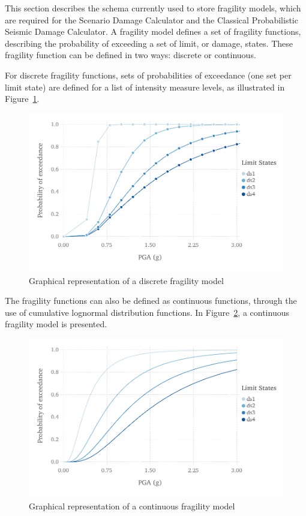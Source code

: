 This section describes the schema currently used to store \glspl{fragility
model}, which are required for the Scenario Damage Calculator and the
Classical Probabilistic Seismic Damage Calculator. A \gls{fragility model}
defines a set of \glspl{fragility function}, describing the probability of
exceeding a set of limit, or damage, states. These \gls{fragility function}
can be defined in two ways: discrete or continuous.

For discrete fragility functions, sets of probabilities of exceedance (one set
per limit state) are defined for a list of intensity measure levels, as
illustrated in Figure~\ref{fig:fragility-discrete}.

\begin{figure}[ht]
\centering
\includegraphics[width=12cm]{figures/risk/fragility-discrete.pdf}
\caption{Graphical representation of a discrete fragility model}
\label{fig:fragility-discrete}
\end{figure}

The \glspl{fragility function} can also be defined as continuous functions,
through the use of cumulative lognormal distribution functions. In
Figure~\ref{fig:fragility-continuous}, a continuous \gls{fragility model} is
presented.

\begin{figure}[ht]
\centering
\includegraphics[width=12cm]{figures/risk/fragility-continuous.pdf}
\caption{Graphical representation of a continuous fragility model}
\label{fig:fragility-continuous}
\end{figure}

